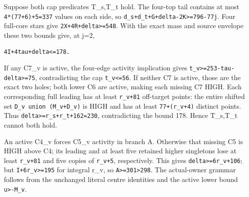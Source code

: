\documentclass[10pt,a4paper]{article}
\theoremstyle{definition}
\begin{document}
Suppose both cap predicates T\_\allowbreak{}s,\allowbreak{}T\_\allowbreak{}t hold. The four-top tail contains
at most \texttt{4*(77+\allowbreak{}6)+\allowbreak{}5=\allowbreak{}337} values on each side,\allowbreak{} so
\texttt{d\_\allowbreak{}\allowbreak{}s+\allowbreak{}d\_\allowbreak{}\allowbreak{}t+\allowbreak{}G+\allowbreak{}delta-2K>=\allowbreak{}796-77j}. Four full-core
stars give \texttt{2X+\allowbreak{}4R+\allowbreak{}delta>=\allowbreak{}548}. With the exact
mass and source envelope these two bounds give,\allowbreak{} at j=\allowbreak{}2,\allowbreak{}

\begin{lstlisting}
4I+4tau+delta<=178.
\end{lstlisting}

If any C7\_\allowbreak{}v is active,\allowbreak{} the four-edge activity implication gives
\texttt{t\_\allowbreak{}\allowbreak{}v>=\allowbreak{}253-tau-delta>=\allowbreak{}75},\allowbreak{} contradicting the cap
\texttt{t\_\allowbreak{}\allowbreak{}v<=\allowbreak{}56}. If neither C7 is active,\allowbreak{} those are
the exact two holes; both lower C6 are active,\allowbreak{} making each missing C7
HIGH. Each corresponding full leading has at least
\texttt{r\_\allowbreak{}\allowbreak{}v+\allowbreak{}81} off-target points: the entire shifted
set \texttt{D\_\allowbreak{}\allowbreak{}v union (M\_\allowbreak{}\allowbreak{}v+\allowbreak{}D\_\allowbreak{}\allowbreak{}v)} is HIGH and has at
least \texttt{77+\allowbreak{}(r\_\allowbreak{}\allowbreak{}v+\allowbreak{}4)} distinct points. Thus
\texttt{delta>=\allowbreak{}r\_\allowbreak{}\allowbreak{}s+\allowbreak{}r\_\allowbreak{}\allowbreak{}t+\allowbreak{}162=\allowbreak{}230},\allowbreak{} contradicting the
bound 178. Hence T\_\allowbreak{}s,\allowbreak{}T\_\allowbreak{}t cannot both hold.

An active C4\_\allowbreak{}v forces C5\_\allowbreak{}v activity in branch A. Otherwise that
missing C5 is HIGH above C4; its leading and at least five retained
higher singletons lose at least \texttt{r\_\allowbreak{}\allowbreak{}v+\allowbreak{}81} and
five copies of \texttt{r\_\allowbreak{}\allowbreak{}v+\allowbreak{}5},\allowbreak{} respectively. This
gives \texttt{delta>=\allowbreak{}6r\_\allowbreak{}\allowbreak{}v+\allowbreak{}106}; but
\texttt{I+\allowbreak{}6r\_\allowbreak{}\allowbreak{}v>=\allowbreak{}195} for integral r\_\allowbreak{}v,\allowbreak{} so
\texttt{A>=\allowbreak{}301>298}. The actual-owner grammar follows
from the unchanged literal centre identities and the active lower bound
\texttt{u>-M\_\allowbreak{}\allowbreak{}v}.
\end{document}
